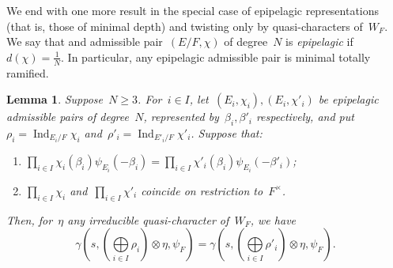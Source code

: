 \documentclass[12pt]{amsart}
\newcommand{\Ind}{\operatorname{Ind}}
\newtheorem{lem}[thm]{Lemma}
\newtheorem{lem}[equation]{Lemma}
\begin{document}
\iffalse %
{\color{blue}
We end with one more result in the special case of epipelagic representations (that is, those of minimal depth) and twisting only by quasi-characters of~$W_F$. We say that and admissible pair~$(E/F,\chi)$ of degree~$N$ is \emph{epipelagic} if~$d(\chi)=\frac 1N$. In particular, any epipelagic admissible pair is minimal totally ramified. 

\begin{lem}\label{lem:epi}
Suppose~$N\ge 3$. For~$i\in I$, let~$(E_i,\chi_i),(E_i,\chi'_i)$ be epipelagic admissible pairs of degree~$N$, represented by~$\beta_i,\beta'_i$ respectively, and put~$\rho_i=\Ind_{E_i/F}\chi_i$ and~$\rho'_i=\Ind_{E'_i/F}\chi'_i$. 
Suppose that: 
\begin{enumerate}
\item\label{lem:epi.i} $\prod_{i\in I} \chi_i(\beta_i)\psi_{E_i}(-\beta_i) = \prod_{i\in I} \chi'_i(\beta_i)\psi_{E_i}(-\beta'_i)$;\\[-8pt]
\item\label{lem:epi.ii} $ \prod_{i\in I} \chi_i$ and~$\prod_{i\in I} \chi'_i$ coincide on restriction to~$F^\times$.
\end{enumerate}
Then, for~$\eta$ any irreducible quasi-character of~$W_F$, we have
\begin{equation}\label{eqn:epi}\textstyle
\gamma(s,(\bigoplus\limits_{i\in I} \rho_i)\otimes\eta,\psi_F) = \gamma(s,(\bigoplus\limits_{i\in I} \rho'_i)\otimes\eta,\psi_F).
\end{equation}
\end{lem}

}
\end{document}

